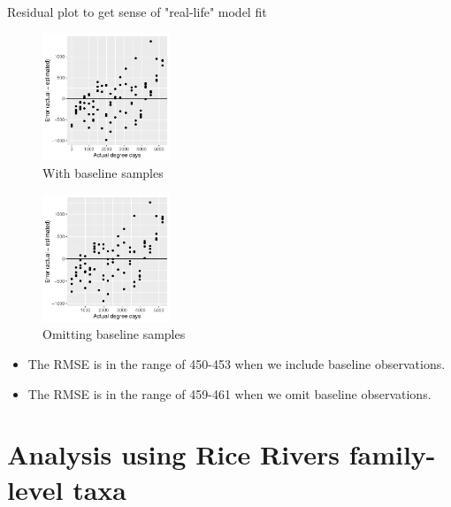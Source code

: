 \documentclass{beamer}
\begin{document}
\begin{frame}{Residual plot to get sense of "real-life" model fit}

  \begin{minipage}{0.47\textwidth}
  \begin{figure}
      \includegraphics[width=1.5in]{HenleyLake/bacteria/use_families/w_scapulae/w_baseline/leave_out_one_scapula_and_one_day_residuals}
      \caption{With baseline samples}
  \end{figure}
  \end{minipage}  
  \begin{minipage}{0.47\textwidth}
  \begin{figure}
      \includegraphics[width=1.5in]{HenleyLake/bacteria/use_families/w_scapulae/no_baseline/leave_out_one_scapula_and_one_day_residuals}
      \caption{Omitting baseline samples}
  \end{figure}
  \end{minipage}
    \vspace{0.1in}
{\scriptsize
\begin{itemize}
\item The RMSE is in the range of 450-453 when we include baseline observations.
\item The RMSE is in the range of 459-461 when we omit baseline observations.
\end{itemize}
}

\end{frame}




\section[Rice Rivers]{Analysis using Rice Rivers family-level taxa}
\end{document}
